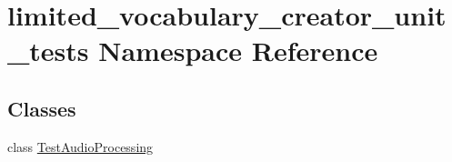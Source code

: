 \hypertarget{namespacelimited__vocabulary__creator__unit__tests}{\section{limited\-\_\-vocabulary\-\_\-creator\-\_\-unit\-\_\-tests Namespace Reference}
\label{namespacelimited__vocabulary__creator__unit__tests}
}
\subsection*{Classes}
\begin{DoxyCompactItemize}
\item 
class \hyperlink{classlimited__vocabulary__creator__unit__tests_1_1TestAudioProcessing}{Test\-Audio\-Processing}
\end{DoxyCompactItemize}
